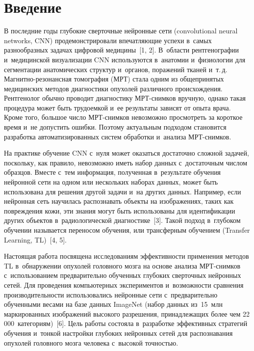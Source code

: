 
\thispagestyle{headings}

\begin{multicols}{2}

\label{st\stat}
  
\section{Введение }

  В последние годы глубокие сверточные нейронные сети (convolutional neural networks, CNN) 
продемонстрировали впе\-чат\-ля\-ющие успехи в~самых разнообразных задачах 
циф\-ро\-вой медицины~[1, 2].\linebreak
 В~об\-ласти рентгенографии и~медицинской 
визуализации CNN используются в~анатомии и~физио\-ло\-гии для сегментации 
анатомических структур и~органов, поражений тканей и~т.\,д.  
Маг\-нит\-но-ре\-зо\-нанс\-ная томография (МРТ) стала одним из 
общепринятых медицинских методов диагностики опухолей различного 
про\-ис\-хож\-де\-ния. Рентгенолог обычно проводит диагностику МРТ-сним\-ков 
вручную, однако такая процедура может быть трудоемкой и~ее результаты 
зависят от опыта врача. Кроме того, большое чис\-ло МРТ-сним\-ков невозможно 
про\-смот\-реть за короткое время и~не допустить ошибки. Поэтому актуальным 
подходом становится разработка автоматизированных сис\-тем обработки 
и~анализа МРТ-сним\-ков. 
  
  На практике обучение CNN с~нуля может оказаться достаточно сложной 
задачей, поскольку, как правило, невозможно иметь набор данных 
с~достаточным числом образцов. Вместе с~тем информация, полученная 
в~результате обучения нейронной сети на одном или нескольких наборах 
данных, может быть использована для решения другой задачи и~на других 
данных. Например, если нейронная сеть научилась распознавать объекты на 
изображениях, таких как повреждения кожи, эти знания могут быть 
использованы для идентификации других объектов в~радиологической 
диагностике~[3]. Такой подход в~глубоком обучении называется переносом 
обучения, или трансферным обучением (Transfer Learning, TL)~[4, 5]. 
  
  Настоящая работа посвящена исследованиям эффективности применения 
методов TL в~обнаружении опухолей головного мозга на основе анализа  
МРТ-сним\-ков с~использованием предварительно обученных глубоких 
сверточных нейронных сетей. Для проведения компьютерных экспериментов 
и~возможности сравнения производительности использовались нейронные сети 
с~предварительно обученными весами на базе данных ImageNet (набор данных 
из~15~млн маркированных изображений высокого разрешения, 
принадлежащих более чем 22\,000~категориям)~[6]. Цель работы состояла 
в~разработке эффективных стратегий обучения и~тонкой настройки глубоких 
нейронных сетей для распознавания опухолей головного мозга человека 
с~высокой точностью. 
  

\end{multicols}
